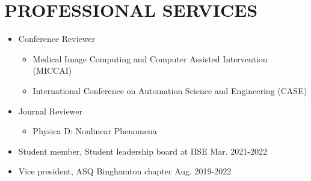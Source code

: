 \documentclass[10pt]{article}
\begin{document}
\section*{\bf PROFESSIONAL SERVICES}
\begin{itemize}	
		\item Conference Reviewer
		\begin{itemize}[label=$\bullet$]
			\item Medical Image Computing and Computer Assisted Intervention (MICCAI)
			\item International Conference on Automation Science and Engineering (CASE)
		\end{itemize}
        \item Journal Reviewer 
        \begin{itemize}[label=$\bullet$]
            \item Physica D: Nonlinear Phenomena
        \end{itemize}
        
	\item Student member, Student leadership board at IISE
	\hfill{Mar. 2021-2022}
	\item Vice president, ASQ Binghamton chapter
	\hfill{Aug. 2019-2022}
\end{itemize}

\end{document}
